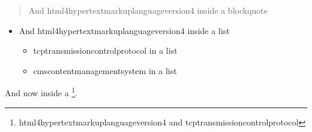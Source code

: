 \begin{quote}

And \ac{html4hypertextmarkuplanguageversion4} inside a blockquote
\end{quote}

\begin{itemize}
\item And \ac{html4hypertextmarkuplanguageversion4} inside a list

\begin{itemize}
\item \ac{tcptransmissioncontrolprotocol} in a list

\item \ac{cmscontentmanagementsystem} in a list

\end{itemize}

\end{itemize}

And now inside a \footnote{\ac{html4hypertextmarkuplanguageversion4} and \ac{tcptransmissioncontrolprotocol}}.




